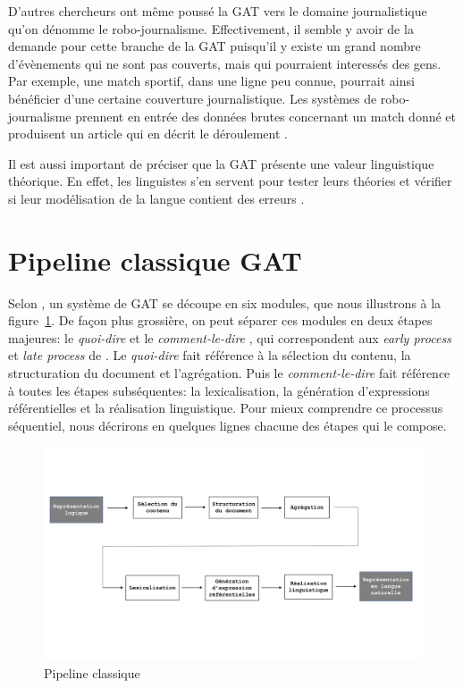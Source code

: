 D'autres chercheurs ont même poussé la \ac{GAT} vers le domaine journalistique qu'on dénomme le robo-journalisme. Effectivement, il semble y avoir de la demande pour cette branche de la \ac{GAT} puisqu'il y existe un grand nombre d'évènements qui ne sont pas couverts, mais qui pourraient interessés des gens. Par exemple, une match sportif, dans une ligne peu connue, pourrait ainsi bénéficier d'une certaine couverture journalistique. Les systèmes de robo-journalisme prennent en entrée des données brutes concernant un match donné et produisent un article qui en décrit le déroulement \citep{W17-3513}.

Il est aussi important de préciser que la \ac{GAT} présente une valeur linguistique théorique. En effet, les linguistes s'en servent pour tester leurs théories et vérifier si leur modélisation de la langue contient des erreurs \citep{DanlosPresentationmodelegeneration1983}. 


\section{Pipeline classique GAT} \label{ppc}

Selon \cite{ReiterBuildingNaturalLanguage2000}, un système de \ac{GAT} se découpe en six modules, que nous illustrons à la figure~\ref{fig:Pipeline}. De façon plus grossière, on peut séparer ces modules en deux étapes majeures: le \emph{quoi-dire} et le \emph{comment-le-dire} \citep{DanlosPresentationmodelegeneration1983}, qui correspondent aux \emph{early process} et \emph{late process} de \cite{gatt18}. Le \emph{quoi-dire} fait référence à la sélection du contenu, la structuration du document et l'agrégation. Puis le \emph{comment-le-dire} fait référence à toutes les étapes subséquentes: la lexicalisation, la génération d'expressions référentielles et la réalisation linguistique. Pour mieux comprendre ce processus séquentiel, nous décrirons en quelques lignes chacune des étapes qui le compose.

\begin{figure}[htb] %
	\centering
	\includegraphics[width=1\textwidth, trim = {0cm 0cm 0cm 0cm},clip]{ch2/figs/pipeline.pdf}
	\caption{Pipeline classique}
	\label{fig:Pipeline}
\end{figure}

